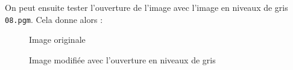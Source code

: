 \documentclass[french,a4paper,10pt]{article}
\begin{document}
	On peut ensuite tester l'ouverture de l'image avec l'image en niveaux de gris \texttt{08.pgm}.
	Cela donne alors :
	\begin{figure}[!htb]
		\begin{minipage}{0.48\textwidth}
			\centering
			\caption{Image originale}\label{Fig:orig-08-5}
		\end{minipage}\hfill
		\begin{minipage}{0.48\textwidth}
			\centering
			\caption{Image modifiée avec l'ouverture en niveaux de gris}\label{Fig:ouverture-grey-08}
		\end{minipage}
	\end{figure}
\end{document}
